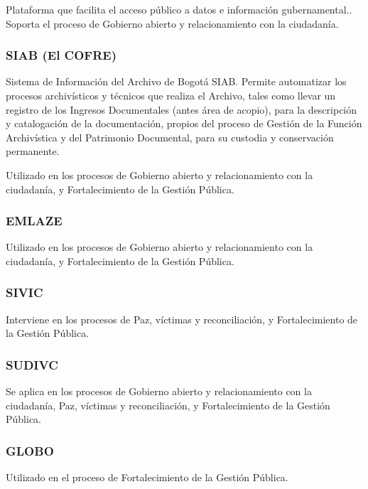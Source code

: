\documentclass[
	a4paper, %
	12pt, %
]{include/CSSullivanBusinessReport}
\begin{document}
Plataforma que facilita el acceso público a datos e información
gubernamental.. Soporta el proceso de Gobierno abierto y relacionamiento
con la ciudadanía.

\subsubsection{SIAB (El COFRE)}\label{sec:siab-el-cofre}

Sistema de Información del Archivo de Bogotá SIAB. Permite automatizar
los procesos archivísticos y técnicos que realiza el Archivo, tales como
llevar un registro de los Ingresos Documentales (antes área de acopio),
para la descripción y catalogación de la documentación, propios del
proceso de Gestión de la Función Archivística y del Patrimonio
Documental, para su custodia y conservación permanente.

Utilizado en los procesos de Gobierno abierto y relacionamiento con la
ciudadanía, y Fortalecimiento de la Gestión Pública.

\subsubsection{EMLAZE}\label{sec:emlaze}

Utilizado en los procesos de Gobierno abierto y relacionamiento con la
ciudadanía, y Fortalecimiento de la Gestión Pública.

\subsubsection{SIVIC}\label{sec:sivic}

Interviene en los procesos de Paz, víctimas y reconciliación, y
Fortalecimiento de la Gestión Pública.

\subsubsection{SUDIVC}\label{sec:sudivc}

Se aplica en los procesos de Gobierno abierto y relacionamiento con la
ciudadanía, Paz, víctimas y reconciliación, y Fortalecimiento de la
Gestión Pública.

\subsubsection{GLOBO}\label{sec:globo}

Utilizado en el proceso de Fortalecimiento de la Gestión Pública.
\end{document}
